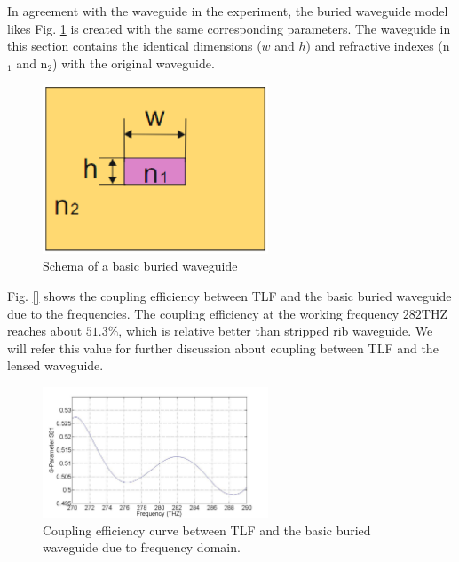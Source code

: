 In agreement with the waveguide in the experiment, the buried waveguide model likes Fig. \ref{fig:buried_waveguide} is created with the same corresponding parameters. The waveguide in this section contains the identical dimensions ($w$ and $h$) and refractive indexes (n$_{1}$ and n$_{2}$) with the original waveguide. 
\begin{figure}[!ht]
\centering
\includegraphics[width=0.6\textwidth]{bilder/buried_waveguide}
\caption{Schema of a basic buried waveguide}
\label{fig:buried_waveguide}
\end{figure}
Fig. \ref{} shows the coupling efficiency between TLF and the basic buried waveguide due to the frequencies. The coupling efficiency at the working frequency $282$THZ reaches about $51.3\%$, which is relative better than stripped rib waveguide. We will refer this value for further discussion about coupling between TLF and the lensed waveguide.  
\begin{figure}[!ht]
\centering
\includegraphics[width=0.6\textwidth]{bilder/s21_sym_waveguide}
\caption{Coupling efficiency curve between TLF and the basic buried waveguide due to frequency domain.}
\label{fig:curve_coupling_basic_buried_waveguide}
\end{figure}
